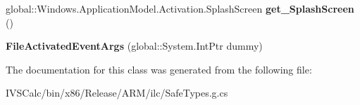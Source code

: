 \begin{DoxyCompactItemize}
global\+::\+Windows.\+Application\+Model.\+Activation.\+Splash\+Screen {\bfseries get\+\_\+\+Splash\+Screen} ()
\item 
\mbox{\label{class_windows_1_1_application_model_1_1_activation_1_1_file_activated_event_args_a9b823668ef64c779eaab2f5823ec10f4}} 
{\bfseries File\+Activated\+Event\+Args} (global\+::\+System.\+Int\+Ptr dummy)
\end{DoxyCompactItemize}


The documentation for this class was generated from the following file\+:\begin{DoxyCompactItemize}
\item 
I\+V\+S\+Calc/bin/x86/\+Release/\+A\+R\+M/ilc/Safe\+Types.\+g.\+cs\end{DoxyCompactItemize}
